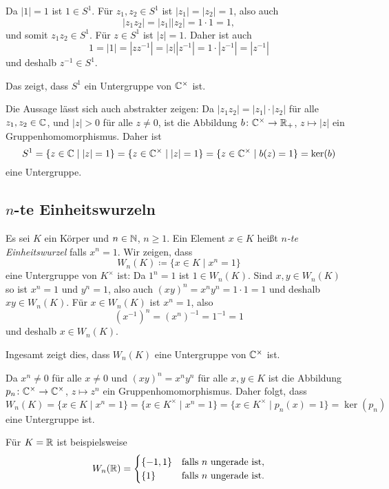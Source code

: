Da $|1| = 1$ ist $1 \in S^1$. Für $z_1, z_2 \in S^1$ ist $|z_1| = |z_2| = 1$, also auch
\[
 |z_1 z_2| = |z_1| |z_2| = 1 \cdot 1 = 1,
\]
und somit $z_1 z_2 \in S^1$. Für $z \in S^1$ ist $|z|= 1$. Daher ist auch
\[
 1 = |1| = |z z^{-1}| = |z| |z^{-1}| = 1 \cdot |z^{-1}| = |z^{-1}|
\]
und deshalb $z^{-1} \in S^1$.

Das zeigt, dass $S^1$ ein Untergruppe von $\mathbb{C}^\times$ ist.


\begin{bem}
 Die Aussage lässt sich auch abstrakter zeigen: Da $|z_1 z_2| = |z_1| \cdot |z_2|$ für alle $z_1, z_2 \in \mathbb{C}$, und $|z| > 0$ für alle $z \neq 0$, ist die Abbildung $b \colon \mathbb{C}^\times \to \mathbb{R}_+$, $z \mapsto |z|$ ein Gruppenhomomorphismus. Daher ist
 \[
  S^1
  = \{z \in \mathbb{C} \mid |z| = 1\}
  = \{z \in \mathbb{C}^\times \mid |z| = 1\}
  = \{z \in \mathbb{C}^\times \mid b(z) = 1\}
  = \ker(b)
 \]
 eine Untergruppe.
\end{bem}



\subsection{\texorpdfstring{$n$}{n}-te Einheitswurzeln}
Es sei $K$ ein Körper und $n \in \mathbb{N}$, $n \geq 1$. Ein Element $x \in K$ heißt \emph{$n$-te Einheitswurzel} falls $x^n = 1$. Wir zeigen, dass
\[
 W_n(K) \coloneqq \{x \in K \mid x^n = 1\}
\]
eine Untergruppe von $K^\times$ ist: Da $1^n = 1$ ist $1 \in W_n(K)$. Sind $x,y \in W_n(K)$ so ist $x^n = 1$ und $y^n = 1$, also auch $(xy)^n = x^n y^n = 1 \cdot 1 = 1$ und deshalb $xy \in W_n(K)$. Für $x \in W_n(K)$ ist $x^n = 1$, also
\[
 (x^{-1})^n = (x^n)^{-1} = 1^{-1} = 1
\]
und deshalb $x \in W_n(K)$.

Ingesamt zeigt dies, dass $W_n(K)$ eine Untergruppe von $\mathbb{C}^\times$ ist.

\begin{bem}
 Da $x^n \neq 0$ für alle $x \neq 0$ und $(xy)^n = x^n y^n$ für alle $x,y \in K$ ist die Abbildung $p_n \colon \mathbb{C}^\times \to \mathbb{C}^\times$, $z \mapsto z^n$ ein Gruppenhomomorphismus. Daher folgt, dass
 \[
  W_n(K)
  = \{x \in K \mid x^n = 1\}
  = \{x \in K^\times \mid x^n = 1\}
  = \{x \in K^\times \mid p_n(x) = 1\}
  = \ker(p_n)
 \]
 eine Untergruppe ist.
\end{bem}


Für $K = \mathbb{R}$ ist beispielsweise
\[
 W_n(\mathbb{R})
 =
 \begin{cases}
  \{-1,1\} & \text{falls $n$ ungerade ist},\\
     \{1\} & \text{falls $n$ ungerade ist}.
 \end{cases}
\]

